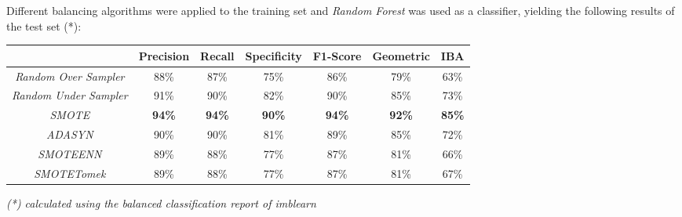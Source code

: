Different balancing algorithms were applied to the training set and \textit{Random Forest} was used as a classifier, yielding the following results of the test set (*):

\begin{table}[H]
	\centering
	\begin{tabular}{@{}ccccccc@{}}
		\toprule
		& \textbf{Precision} & \textbf{Recall} & \textbf{Specificity} & \textbf{F1-Score} & \textbf{Geometric} & \textbf{IBA}  \\ \midrule
		\textit{Random Over Sampler}  & 88\%               & 87\%            & 75\%                 & 86\%              & 79\%               & 63\%          \\
		\textit{Random Under Sampler} & 91\%               & 90\%            & 82\%                 & 90\%              & 85\%               & 73\%          \\
		\textit{SMOTE}                & \textbf{94\%}      & \textbf{94\%}   & \textbf{90\%}        & \textbf{94\%}     & \textbf{92\%}      & \textbf{85\%} \\
		\textit{ADASYN}               & 90\%               & 90\%            & 81\%                 & 89\%              & 85\%               & 72\%          \\
		\textit{SMOTEENN}             & 89\%               & 88\%            & 77\%                 & 87\%              & 81\%               & 66\%          \\
		\textit{SMOTETomek}           & 89\%               & 88\%            & 77\%                 & 87\%              & 81\%               & 67\%          \\ \bottomrule
	\end{tabular}
\end{table}

\textit{(*) calculated using the balanced classification report of imblearn}


